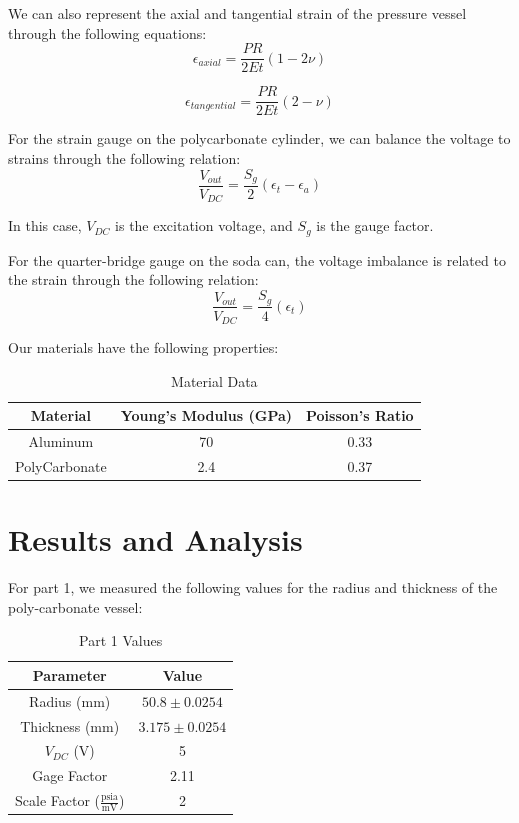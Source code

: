 \documentclass{article}
\begin{document}
We can also represent the axial and tangential strain of the pressure vessel through the following equations:
\[
\epsilon_{axial} = \frac{PR}{2E t}(1 - 2\nu)
\]

\[
\epsilon_{tangential} = \frac{PR}{2E t}(2 - \nu)
\]

For the strain gauge on the polycarbonate cylinder, we can balance the voltage to strains through the following relation:
\[
  \frac{V_{out}}{V_{DC}} = \frac{S_g}{2}(\epsilon_t - \epsilon_a)
\]

In this case, $V_{DC}$ is the excitation voltage, and $S_g$ is the gauge factor.

For the quarter-bridge gauge on the soda can, the voltage imbalance is related to the strain through the following relation:
\[
  \frac{V_{out}}{V_{DC}} = \frac{S_g}{4}(\epsilon_t)
\]

Our materials have the following properties:
\begin{table}[h]
  \centering
  \caption{Material Data}
  \label{tab:material-data}
  \begin{tabular}{|c|c|c|}
  \hline
  Material       & Young's Modulus (GPa) & Poisson's Ratio \\
  \hline
  Aluminum       & 70                     & 0.33            \\
  PolyCarbonate  & 2.4                    & 0.37            \\
  \hline
  \end{tabular}
\end{table}
  


\section{Results and Analysis}

For part 1, we measured the following values for the radius and thickness of the poly-carbonate vessel:

\begin{table}[H]
  \centering
  \caption{Part 1 Values}
  \label{tab:part1-values}
  \begin{tabular}{|c|c|}
  \hline
  Parameter               & Value           \\
  \hline
  Radius (mm)             & $50.8 \pm 0.0254$   \\
  Thickness (mm)          & $3.175 \pm 0.0254$  \\
  $V_{DC}$ (V)            & 5               \\
  Gage Factor             & 2.11            \\
  Scale Factor ($\frac{\text{psia}}{\text{mV}}$)   & 2  \\
  \hline
  \end{tabular}
\end{table}
\end{document}
